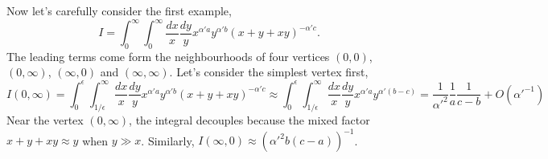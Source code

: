 \documentclass[12pt]{article}
\theoremstyle{definition}
\theoremstyle{plain}
\begin{document}

Now let's carefully consider the first example,
\[
	I=\int_0^\infty \int_0^\infty\frac{dx}{x}\frac{dy}{y}x^{\alpha' a}y^{\alpha' b}(x+y+x y)^{-\alpha' c}.
\]
The leading terms come form the neighbourhoods of four vertices $(0,0)$, $(0,\infty)$, $(\infty,0)$ and $(\infty,\infty)$. Let's consider the simplest vertex first, 
\[
	I(0,\infty)=\int_{0}^\epsilon\int_{1/\epsilon}^\infty \frac{dx}{x}\frac{dy}{y}x^{\alpha' a}y^{\alpha' b}(x+y+xy)^{-\alpha' c}\approx \int_{0}^\epsilon\int_{1/\epsilon}^\infty \frac{dx}{x}\frac{dy}{y}x^{\alpha' a}y^{\alpha' (b-c)}= 
	\frac{1}{{\alpha'}^2}\frac{1}{a} \frac{1}{c-b}+O({\alpha'}^{-1})
\]
Near the vertex $(0,\infty)$, the integral decouples because the mixed factor $x+y+xy \approx y$ when $y \gg x$.  Similarly, $I(\infty,0)\approx ({\alpha'}^2 b (c-a))^{-1}$. 
\end{document}
